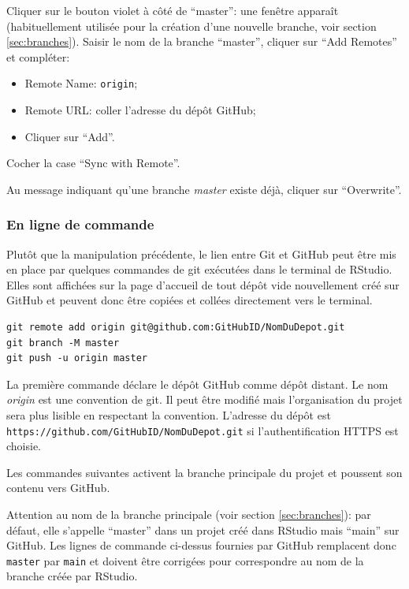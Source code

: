 \documentclass[
  12pt,
  french,
  a4paper,
  extrafontsizes,onecolumn,openright
  ]{memoir}
\providecommand{\tightlist}{%
  \setlength{\itemsep}{0pt}\setlength{\parskip}{0pt}}
\begin{document}
Cliquer sur le bouton violet à côté de \enquote{master}: une fenêtre apparaît (habituellement utilisée pour la création d'une nouvelle branche, voir section \ref{sec:branches}).
Saisir le nom de la branche \enquote{master}, cliquer sur \enquote{Add Remotes} et compléter:

\begin{itemize}
\tightlist
\item
  Remote Name: \texttt{origin};
\item
  Remote URL: coller l'adresse du dépôt GitHub;
\item
  Cliquer sur \enquote{Add}.
\end{itemize}

Cocher la case \enquote{Sync with Remote}.

Au message indiquant qu'une branche \emph{master} existe déjà, cliquer sur \enquote{Overwrite}.

\hypertarget{en-ligne-de-commande}{%
\subsubsection{En ligne de commande}\label{en-ligne-de-commande}}

Plutôt que la manipulation précédente, le lien entre Git et GitHub peut être mis en place par quelques commandes de git exécutées dans le terminal de RStudio.
Elles sont affichées sur la page d'accueil de tout dépôt vide nouvellement créé sur GitHub et peuvent donc être copiées et collées directement vers le terminal.

\begin{verbatim}
git remote add origin git@github.com:GitHubID/NomDuDepot.git
git branch -M master
git push -u origin master
\end{verbatim}

La première commande déclare le dépôt GitHub comme dépôt distant.
Le nom \emph{origin} est une convention de git.
Il peut être modifié mais l'organisation du projet sera plus lisible en respectant la convention.
L'adresse du dépôt est \texttt{https://github.com/GitHubID/NomDuDepot.git} si l'authentification HTTPS est choisie.

Les commandes suivantes activent la branche principale du projet et poussent son contenu vers GitHub.

Attention au nom de la branche principale (voir section \ref{sec:branches}): par défaut, elle s'appelle \enquote{master} dans un projet créé dans RStudio mais \enquote{main} sur GitHub.
Les lignes de commande ci-dessus fournies par GitHub remplacent donc \texttt{master} par \texttt{main} et doivent être corrigées pour correspondre au nom de la branche créée par RStudio.
\end{document}
